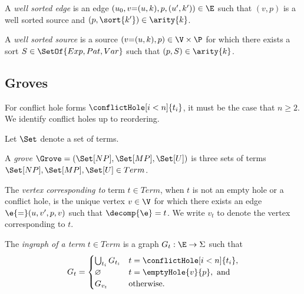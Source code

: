 \begin{definition}
  A \emph{well sorted edge} is an edge $(u_0, v{=}(u, k), p, (u', k')) \in \E$
  such that $(v, p)$ is a well sorted source
  and $(p, \sort{k'}) \in \arity{k}$.
\end{definition}

\begin{definition}
  A \emph{well sorted source} is a source $(v{=}(u, k), p) \in \V \times \P$
  for which there exists a sort $S \in \SetOf{Exp, Pat, Var}$
  such that $(p, S) \in \arity{k}$.
\end{definition}


\subsection{Groves}
\label{sec:Formalism:Groves}

\figureTermSyntaxContent

For conflict hole forms $\conflictHole[i < n]{t_i}$,
it must be the case that $n \geq 2$.
We identify conflict holes up to reordering.

Let $\Set$ denote a set of terms.

\begin{definition}
  A \emph{grove} $\Grove = (\Set[NP], \Set[MP], \Set[U])$
  is three sets of terms $\Set[NP], \Set[MP], \Set[U] \in Term$.
\end{definition}

\begin{definition}
  The \emph{vertex corresponding to} term $t \in Term$,
  when $t$ is not an empty hole or a conflict hole,
  is the unique vertex $v \in \V$ for which there exists an edge $\e{=}(u, v', p, v)$
  such that $\decomp{\e} = t$.
  We write $v_t$ to denote the vertex corresponding to $t$.
\end{definition}

\begin{definition}
  The \emph{ingraph of a term} $t \in Term$ is a graph $G_t : \E \rightarrow \Sigma$ such that
  \[
    G_t =
    \begin{cases}
      \bigcup_{t_i} G_{t_i} & t = \conflictHole[i < n]{t_i}, \\
      \varnothing & t = \emptyHole{v}{p}, \text{ and} \\
      G_{v_t} & \text{otherwise.} \\
    \end{cases}
  \]
\end{definition}

